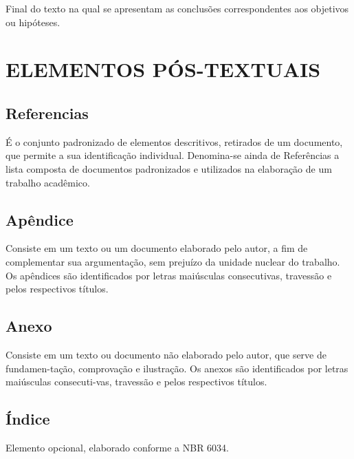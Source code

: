 Final do texto na qual se apresentam as conclusões correspondentes aos objetivos ou hipóteses.

\section{ELEMENTOS PÓS-TEXTUAIS}

\subsection{Referencias}

É o conjunto padronizado de elementos descritivos, retirados de
um documento, que permite a sua identificação individual. Denomina-se ainda de Referências a lista composta de documentos padronizados e utilizados na elaboração de um trabalho acadêmico.

\subsection{Apêndice}

Consiste em um texto ou um documento elaborado pelo autor, a fim
de complementar sua argumentação, sem prejuízo da unidade nuclear do trabalho. Os apêndices são identificados por letras maiúsculas consecutivas, travessão e pelos respectivos títulos.

\subsection{Anexo}

Consiste em um texto ou documento não elaborado pelo autor, que
serve de fundamen-tação, comprovação e ilustração. Os anexos são identificados por letras maiúsculas consecuti-vas, travessão e pelos respectivos títulos.

\subsection{Índice}

Elemento opcional, elaborado conforme a NBR 6034.

